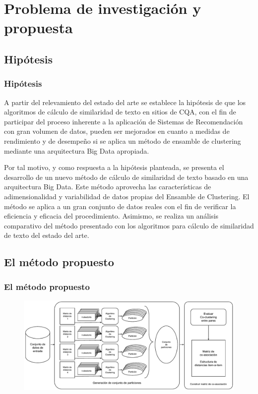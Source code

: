 \section{Problema de investigación y propuesta}

\subsection{Hipótesis}
\begin{frame}[allowframebreaks]
	\frametitle{Hipótesis}
	\begin{tcolorbox}[colback=blue!5,colframe=blue!40!black,title=Hipótesis del trabajo de tesis]
		A partir del relevamiento del estado del arte se establece la hipótesis de que los algoritmos de cálculo de similaridad de texto en sitios de CQA, con el fin de participar del proceso inherente a la aplicación de Sistemas de Recomendación con gran volumen de datos, pueden ser mejorados en cuanto a medidas de rendimiento y de desempeño si se aplica un método de ensamble de clustering mediante una arquitectura Big Data apropiada.
	\end{tcolorbox}

	\framebreak

	\begin{tcolorbox}[colback=blue!5,colframe=blue!40!black,title=Hipótesis del trabajo de tesis (cont.)]
		\bigskip Por tal motivo, y como respuesta a la hipótesis planteada, se presenta el desarrollo de un nuevo método de cálculo de similaridad de texto basado en una arquitectura Big Data. Este método aprovecha las características de adimensionalidad y variabilidad de datos propias del Ensamble de Clustering. El método se aplica a un gran conjunto de datos reales con el fin de verificar la eficiencia y eficacia del procedimiento. Asimismo, se realiza un análisis comparativo del método presentado con los algoritmos para cálculo de similaridad de texto del estado del arte.
	\end{tcolorbox}
\end{frame}

\subsection{El método propuesto}
\begin{frame}
	\frametitle{El método propuesto}
	\begin{figure}
		\centering
		\includegraphics[width=0.9\linewidth]{../8_problema_investigacion/imagenes/metodo_equal}
		\label{fig:metodoequal}
	\end{figure}
\end{frame}

